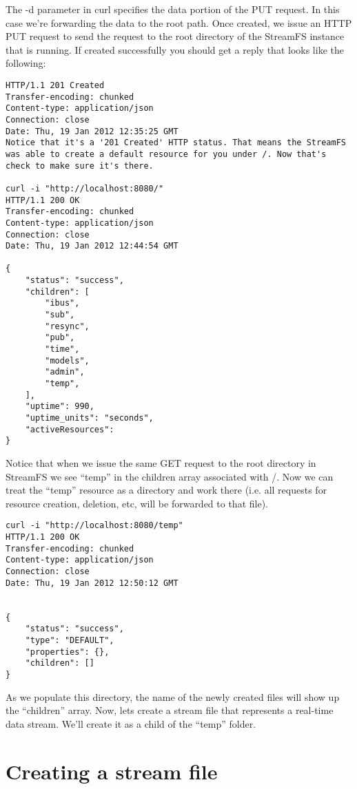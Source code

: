 The -d parameter in curl specifies the data portion of the PUT request. In this case we're forwarding the data to the root path. Once created, we issue an HTTP PUT request to send the request to the root directory of the StreamFS instance that is running. If created successfully you should get a reply that looks like the following:

\begin{lstlisting}
HTTP/1.1 201 Created
Transfer-encoding: chunked
Content-type: application/json
Connection: close
Date: Thu, 19 Jan 2012 12:35:25 GMT
Notice that it's a '201 Created' HTTP status. That means the StreamFS was able to create a default resource for you under /. Now that's check to make sure it's there.

curl -i "http://localhost:8080/"
HTTP/1.1 200 OK
Transfer-encoding: chunked
Content-type: application/json
Connection: close
Date: Thu, 19 Jan 2012 12:44:54 GMT

{
    "status": "success",
    "children": [
        "ibus",
        "sub",
        "resync",
        "pub",
        "time",
        "models",
        "admin",
        "temp",
    ],
    "uptime": 990,
    "uptime_units": "seconds",
    "activeResources": 
}
\end{lstlisting}

Notice that when we issue the same GET request to the root directory in StreamFS we see ``temp'' in the children array associated with /. Now we can treat the ``temp'' resource as a directory and work there (i.e. all requests for resource creation, deletion, etc, will be forwarded to that file).

\begin{lstlisting}
curl -i "http://localhost:8080/temp"
HTTP/1.1 200 OK
Transfer-encoding: chunked
Content-type: application/json
Connection: close
Date: Thu, 19 Jan 2012 12:50:12 GMT


{
    "status": "success",
    "type": "DEFAULT",
    "properties": {},
    "children": []
}
\end{lstlisting}

As we populate this directory, the name of the newly created files will show up the ``children'' array. Now, lets create a stream file that represents a real-time data stream. We'll create it as a child of the ``temp'' folder.

\section{Creating a stream file}

